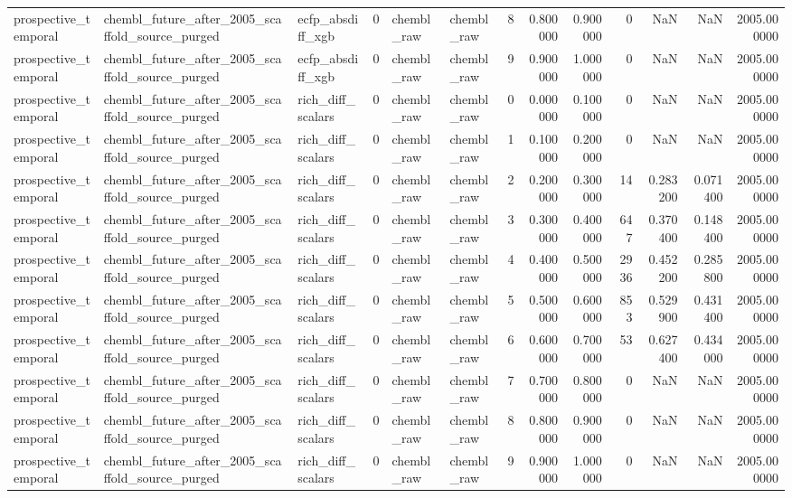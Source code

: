 \begin{longtable}{lllrllrrrrrrr}
prospective\_temporal & chembl\_future\_after\_2005\_scaffold\_source\_purged & ecfp\_absdiff\_xgb & 0 & chembl\_raw & chembl\_raw & 8 & 0.800000 & 0.900000 & 0 & NaN & NaN & 2005.000000 \\
prospective\_temporal & chembl\_future\_after\_2005\_scaffold\_source\_purged & ecfp\_absdiff\_xgb & 0 & chembl\_raw & chembl\_raw & 9 & 0.900000 & 1.000000 & 0 & NaN & NaN & 2005.000000 \\
prospective\_temporal & chembl\_future\_after\_2005\_scaffold\_source\_purged & rich\_diff\_scalars & 0 & chembl\_raw & chembl\_raw & 0 & 0.000000 & 0.100000 & 0 & NaN & NaN & 2005.000000 \\
prospective\_temporal & chembl\_future\_after\_2005\_scaffold\_source\_purged & rich\_diff\_scalars & 0 & chembl\_raw & chembl\_raw & 1 & 0.100000 & 0.200000 & 0 & NaN & NaN & 2005.000000 \\
prospective\_temporal & chembl\_future\_after\_2005\_scaffold\_source\_purged & rich\_diff\_scalars & 0 & chembl\_raw & chembl\_raw & 2 & 0.200000 & 0.300000 & 14 & 0.283200 & 0.071400 & 2005.000000 \\
prospective\_temporal & chembl\_future\_after\_2005\_scaffold\_source\_purged & rich\_diff\_scalars & 0 & chembl\_raw & chembl\_raw & 3 & 0.300000 & 0.400000 & 647 & 0.370400 & 0.148400 & 2005.000000 \\
prospective\_temporal & chembl\_future\_after\_2005\_scaffold\_source\_purged & rich\_diff\_scalars & 0 & chembl\_raw & chembl\_raw & 4 & 0.400000 & 0.500000 & 2936 & 0.452200 & 0.285800 & 2005.000000 \\
prospective\_temporal & chembl\_future\_after\_2005\_scaffold\_source\_purged & rich\_diff\_scalars & 0 & chembl\_raw & chembl\_raw & 5 & 0.500000 & 0.600000 & 853 & 0.529900 & 0.431400 & 2005.000000 \\
prospective\_temporal & chembl\_future\_after\_2005\_scaffold\_source\_purged & rich\_diff\_scalars & 0 & chembl\_raw & chembl\_raw & 6 & 0.600000 & 0.700000 & 53 & 0.627400 & 0.434000 & 2005.000000 \\
prospective\_temporal & chembl\_future\_after\_2005\_scaffold\_source\_purged & rich\_diff\_scalars & 0 & chembl\_raw & chembl\_raw & 7 & 0.700000 & 0.800000 & 0 & NaN & NaN & 2005.000000 \\
prospective\_temporal & chembl\_future\_after\_2005\_scaffold\_source\_purged & rich\_diff\_scalars & 0 & chembl\_raw & chembl\_raw & 8 & 0.800000 & 0.900000 & 0 & NaN & NaN & 2005.000000 \\
prospective\_temporal & chembl\_future\_after\_2005\_scaffold\_source\_purged & rich\_diff\_scalars & 0 & chembl\_raw & chembl\_raw & 9 & 0.900000 & 1.000000 & 0 & NaN & NaN & 2005.000000 \\

\end{longtable}
